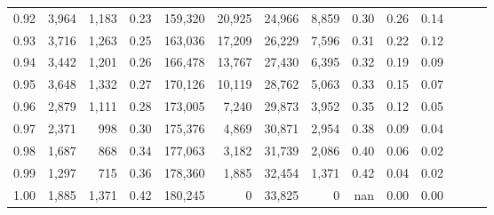 \begin{tabular}{rrrrrrrrrrrrrr}
0.92 &  3,964 &  1,183 &  0.23 &  159,320 &   20,925 &  24,966 &   8,859 &  0.30 &  0.26 &      0.14 \\
0.93 &  3,716 &  1,263 &  0.25 &  163,036 &   17,209 &  26,229 &   7,596 &  0.31 &  0.22 &      0.12 \\
0.94 &  3,442 &  1,201 &  0.26 &  166,478 &   13,767 &  27,430 &   6,395 &  0.32 &  0.19 &      0.09 \\
0.95 &  3,648 &  1,332 &  0.27 &  170,126 &   10,119 &  28,762 &   5,063 &  0.33 &  0.15 &      0.07 \\
0.96 &  2,879 &  1,111 &  0.28 &  173,005 &    7,240 &  29,873 &   3,952 &  0.35 &  0.12 &      0.05 \\
0.97 &  2,371 &    998 &  0.30 &  175,376 &    4,869 &  30,871 &   2,954 &  0.38 &  0.09 &      0.04 \\
0.98 &  1,687 &    868 &  0.34 &  177,063 &    3,182 &  31,739 &   2,086 &  0.40 &  0.06 &      0.02 \\
0.99 &  1,297 &    715 &  0.36 &  178,360 &    1,885 &  32,454 &   1,371 &  0.42 &  0.04 &      0.02 \\
1.00 &  1,885 &  1,371 &  0.42 &  180,245 &        0 &  33,825 &       0 &   nan &  0.00 &      0.00 \\
\bottomrule
\end{tabular}
